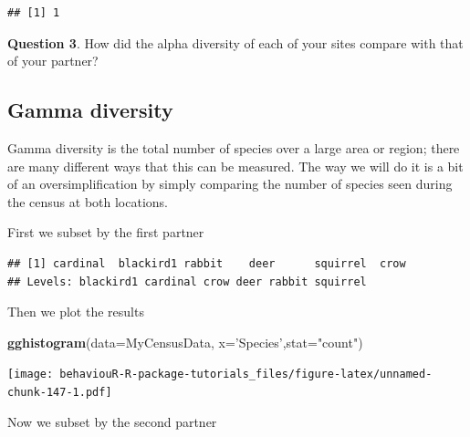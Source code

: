 \documentclass[]{book}
\newenvironment{Shaded}{\begin{snugshade}}{\end{snugshade}}
\newcommand{\DataTypeTok}[1]{\textcolor[rgb]{0.13,0.29,0.53}{#1}}
\newcommand{\KeywordTok}[1]{\textcolor[rgb]{0.13,0.29,0.53}{\textbf{#1}}}
\newcommand{\NormalTok}[1]{#1}
\newcommand{\OperatorTok}[1]{\textcolor[rgb]{0.81,0.36,0.00}{\textbf{#1}}}
\newcommand{\StringTok}[1]{\textcolor[rgb]{0.31,0.60,0.02}{#1}}
\begin{document}
\begin{verbatim}
## [1] 1
\end{verbatim}

\textbf{Question 3}. How did the alpha diversity of each of your sites compare with that of your partner?

\hypertarget{gamma-diversity}{%
\subsection{Gamma diversity}\label{gamma-diversity}}

Gamma diversity is the total number of species over a large area or region; there are many different ways that this can be measured. The way we will do it is a bit of an oversimplification by simply comparing the number of species seen during the census at both locations.

First we subset by the first partner

\begin{Shaded}
\end{Shaded}

\begin{verbatim}
## [1] cardinal  blackird1 rabbit    deer      squirrel  crow     
## Levels: blackird1 cardinal crow deer rabbit squirrel
\end{verbatim}

Then we plot the results

\begin{Shaded}
\begin{Highlighting}[]
\KeywordTok{gghistogram}\NormalTok{(}\DataTypeTok{data=}\NormalTok{MyCensusData, }\DataTypeTok{x=}\StringTok{'Species'}\NormalTok{,}\DataTypeTok{stat=}\StringTok{"count"}\NormalTok{)}
\end{Highlighting}
\end{Shaded}

\texttt{[image: behaviouR-R-package-tutorials\_files/figure-latex/unnamed-chunk-147-1.pdf]}

Now we subset by the second partner

\begin{Shaded}
\end{Shaded}
\end{document}
